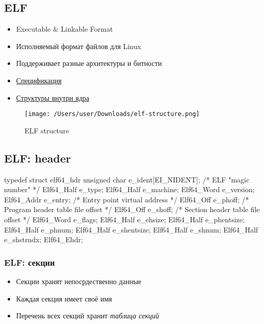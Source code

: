\subsection{ELF}
  \begin{itemize}
    \item Executable \& Linkable Format
    \item Исполняемый формат файлов для Linux
    \item Поддерживает разные архитектуры и битности
    \item \href{http://refspecs.linuxbase.org/elf/x86_64-abi-0.99.pdf}{Спецификация}
    \item \href{https://github.com/torvalds/linux/blob/master/include/uapi/linux/elf.h}{Структуры внутри ядра}
  \end{itemize}

\begin{figure}[H]
\centering
  \texttt{[image: /Users/user/Downloads/elf-structure.png]}
  \caption{ELF structure}
  \label{fig:elf_structure}
\end{figure} 
  
\subsection{ELF: header}

\begin{cminted}
typedef struct elf64_hdr {
  unsigned char  e_ident[EI_NIDENT];  /* ELF "magic number" */
  Elf64_Half e_type;
  Elf64_Half e_machine;
  Elf64_Word e_version;
  Elf64_Addr e_entry;    /* Entry point virtual address */
  Elf64_Off e_phoff;    /* Program header table file offset */
  Elf64_Off e_shoff;    /* Section header table file offset */
  Elf64_Word e_flags;
  Elf64_Half e_ehsize;
  Elf64_Half e_phentsize;
  Elf64_Half e_phnum;
  Elf64_Half e_shentsize;
  Elf64_Half e_shnum;
  Elf64_Half e_shstrndx;
} Elf64_Ehdr;
\end{cminted}

\subsubsection{ELF: секции}
  \begin{itemize}
    \item Секции хранят непосрдественно данные
    \item Каждая секция имеет своё имя
    \item Перечень всех секций хранит \textit{таблица секций}
  \end{itemize}
    
